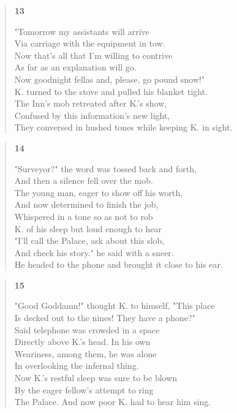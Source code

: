 \documentclass{article}
\begin{document}
\begin{verse}
  \begin{center}
    \textbf{13} \\
  \end{center}
  "Tomorrow my assistants will arrive \\
  Via carriage with the equipment in tow. \\
  Now that's all that I'm willing to contrive \\
  As far as an explanation will go. \\
  Now goodnight fellas and, please, go pound snow!" \\
  K. turned to the stove and pulled his blanket tight. \\
  The Inn's mob retreated after K.'s show, \\
  Confused by this information's new light, \\
  They conversed in hushed tones while keeping K. in sight.
\end{verse}
\begin{verse}
  \begin{center}
    \textbf{14} \\
  \end{center}
  "Surveyor?" the word was tossed back and forth, \\
  And then a silence fell over the mob. \\
  The young man, eager to show off his worth, \\
  And now determined to finish the job, \\
  Whispered in a tone so as not to rob \\
  K. of his sleep but loud enough to hear \\
  "I'll call the Palace, ask about this slob, \\
  And check his story." he said with a sneer. \\
  He headed to the phone and brought it close to his ear.
\end{verse}
\begin{verse}
  \begin{center}
    \textbf{15} \\
  \end{center}
  "Good Goddamn!" thought K. to himself, "This place \\
  Is decked out to the nines! They have a phone?" \\
  Said telephone was crowded in a space \\
  Directly above K.'s head. In his own \\
  Weariness, among them, he was alone \\
  In overlooking the infernal thing. \\
  Now K.'s restful sleep was sure to be blown \\
  By the eager fellow's attempt to ring \\
  The Palace. And now poor K. had to hear him sing.
\end{verse}
\end{document}
